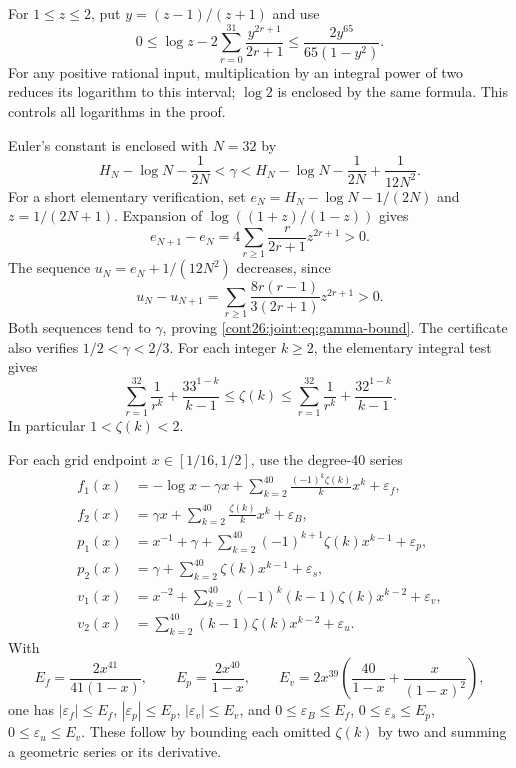 For $1\le z\le2$, put $y=(z-1)/(z+1)$ and use
\begin{equation}\label{cont26:joint:eq:log-bound}
 0\le\log z-2\sum_{r=0}^{31}\frac{y^{2r+1}}{2r+1}
 \le\frac{2y^{65}}{65(1-y^2)}.
\end{equation}
For any positive rational input, multiplication by an integral power
of two reduces its logarithm to this interval; $\log2$ is enclosed
by the same formula.  This controls all logarithms in the proof.

Euler's constant is enclosed with $N=32$ by
\begin{equation}\label{cont26:joint:eq:gamma-bound}
 H_N-\log N-\frac1{2N}<\gamma<
 H_N-\log N-\frac1{2N}+\frac1{12N^2}.
\end{equation}
For a short elementary verification, set
$e_N=H_N-\log N-1/(2N)$ and $z=1/(2N+1)$.
Expansion of $\log((1+z)/(1-z))$ gives
\[
 e_{N+1}-e_N=
 4\sum_{r\ge1}\frac{r}{2r+1}z^{2r+1}>0.
\]
The sequence $u_N=e_N+1/(12N^2)$ decreases, since
\[
 u_N-u_{N+1}=
 \sum_{r\ge1}\frac{8r(r-1)}{3(2r+1)}z^{2r+1}>0.
\]
Both sequences tend to $\gamma$, proving \eqref{cont26:joint:eq:gamma-bound}.
The certificate also verifies $1/2<\gamma<2/3$.
For each integer $k\ge2$, the elementary integral test gives
\begin{equation}\label{cont26:joint:eq:zeta-bound}
 \sum_{r=1}^{32}\frac1{r^k}+\frac{33^{1-k}}{k-1}
 \le\zeta(k)\le
 \sum_{r=1}^{32}\frac1{r^k}+\frac{32^{1-k}}{k-1}.
\end{equation}
In particular $1<\zeta(k)<2$.

For each grid endpoint $x\in[1/16,1/2]$, use the degree-40 series
\begin{align*}
 f_1(x)&=-\log x-\gamma x+
       \sum_{k=2}^{40}\frac{(-1)^k\zeta(k)}k x^k+\varepsilon_f,\\
 f_2(x)&=\gamma x+
       \sum_{k=2}^{40}\frac{\zeta(k)}k x^k+\varepsilon_B,\\
 p_1(x)&=x^{-1}+\gamma+
       \sum_{k=2}^{40}(-1)^{k+1}\zeta(k)x^{k-1}+\varepsilon_p,\\
 p_2(x)&=\gamma+
       \sum_{k=2}^{40}\zeta(k)x^{k-1}+\varepsilon_s,\\
 v_1(x)&=x^{-2}+
       \sum_{k=2}^{40}(-1)^k(k-1)\zeta(k)x^{k-2}+\varepsilon_v,\\
 v_2(x)&=\sum_{k=2}^{40}(k-1)\zeta(k)x^{k-2}+\varepsilon_u.
\end{align*}
With
\[
 E_f=\frac{2x^{41}}{41(1-x)},\qquad
 E_p=\frac{2x^{40}}{1-x},\qquad
 E_v=2x^{39}\left(\frac{40}{1-x}+\frac{x}{(1-x)^2}\right),
\]
one has $|\varepsilon_f|\le E_f$,
$|\varepsilon_p|\le E_p$, $|\varepsilon_v|\le E_v$,
and $0\le\varepsilon_B\le E_f$,
$0\le\varepsilon_s\le E_p$, $0\le\varepsilon_u\le E_v$.
These follow by bounding each omitted $\zeta(k)$ by two and summing
a geometric series or its derivative.

